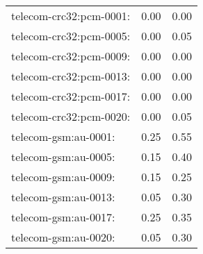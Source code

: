 \begin{longtable}{lrr}
telecom-crc32:pcm-0001: & 0.00 & 0.00 \\
telecom-crc32:pcm-0005: & 0.00 & 0.05 \\
telecom-crc32:pcm-0009: & 0.00 & 0.00 \\
telecom-crc32:pcm-0013: & 0.00 & 0.00 \\
telecom-crc32:pcm-0017: & 0.00 & 0.00 \\
telecom-crc32:pcm-0020: & 0.00 & 0.05 \\
telecom-gsm:au-0001: & 0.25 & 0.55 \\
telecom-gsm:au-0005: & 0.15 & 0.40 \\
telecom-gsm:au-0009: & 0.15 & 0.25 \\
telecom-gsm:au-0013: & 0.05 & 0.30 \\
telecom-gsm:au-0017: & 0.25 & 0.35 \\
telecom-gsm:au-0020: & 0.05 & 0.30 \\
\end{longtable}
